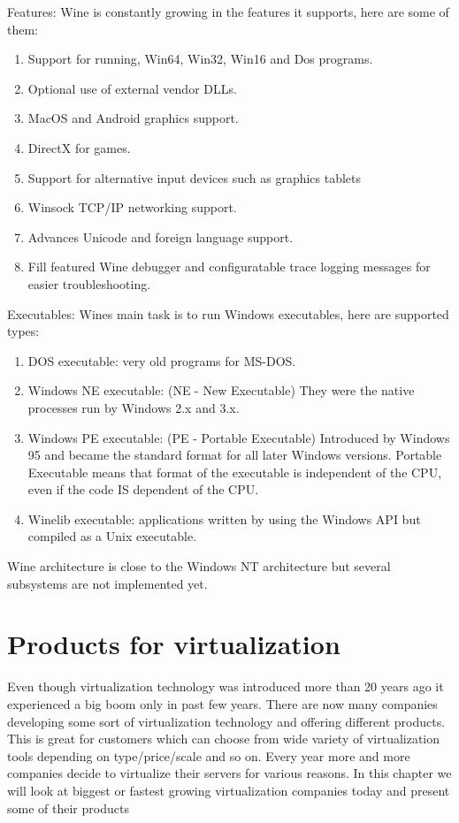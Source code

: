 Features:
Wine is constantly growing in the features it supports, here are some of them:
\begin{enumerate}
\item Support for running, Win64, Win32, Win16 and Dos programs.
\item Optional use of external vendor DLLs.
\item MacOS and Android graphics support.
\item DirectX for games.
\item Support for alternative input devices such as graphics tablets
\item Winsock TCP/IP networking support.
\item Advances Unicode and foreign language support.
\item Fill featured Wine debugger and configuratable trace logging messages for easier troubleshooting.
\end{enumerate}

Executables:
Wines main task is to run Windows executables, here are supported types:
\begin{enumerate}
\item DOS executable: very old programs for MS-DOS.
\item Windows NE executable: (NE - New Executable) They were the native processes run by Windows 2.x and 3.x.
\item Windows PE executable: (PE - Portable Executable) Introduced by Windows 95 and became the standard format for all later Windows versions. Portable Executable means that format of the executable is independent of the CPU, even if the code IS dependent of the CPU.
\item Winelib executable: applications written by using the Windows API but compiled as a Unix executable.
\end{enumerate}

Wine architecture is close to the Windows NT architecture but several subsystems are not implemented yet.


\chapter{Products for virtualization}

Even though virtualization technology was introduced more than 20 years ago it experienced a big boom only in past few years. There are now many companies developing some sort of virtualization technology and offering different products. This is great for customers which can choose from wide variety of virtualization tools depending on type/price/scale and so on. Every year more and more companies decide to virtualize their servers for various reasons. In this chapter we will look at biggest or fastest growing virtualization companies today and present some of their products

